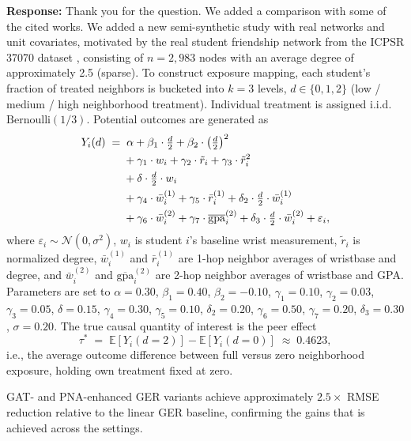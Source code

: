 \documentclass{article}
\theoremstyle{plain}
\theoremstyle{definition}
\theoremstyle{remark}
\begin{document}
\noindent\textbf{Response:}
Thank you for the question. We added a comparison with some of the cited works. We added a new semi-synthetic study with real networks and unit covariates, motivated by the real student friendship network from the ICPSR 37070 dataset
\citep{aronow2017estimating}, consisting of $n = 2{,}983$ nodes with an average
degree of approximately 2.5 (sparse). To construct exposure mapping, each student's fraction of treated neighbors is bucketed into $k = 3$ levels,
$d \in \{0, 1, 2\}$ (low / medium / high neighborhood treatment). Individual
treatment is assigned i.i.d.\ $\mathrm{Bernoulli}(1/3)$. 
Potential outcomes are generated as
\begin{align}
  Y_i(d) \;=\;
    &\;\alpha
     + \beta_1 \cdot \tfrac{d}{2}
     + \beta_2 \cdot \bigl(\tfrac{d}{2}\bigr)^2 \notag \\
    &+ \gamma_1 \cdot w_i
     + \gamma_2 \cdot \tilde{r}_i
     + \gamma_3 \cdot \tilde{r}_i^2 \notag \\
    &+ \delta \cdot \tfrac{d}{2} \cdot w_i \notag \\
    &+ \gamma_4 \cdot \bar{w}_i^{(1)}
     + \gamma_5 \cdot \bar{r}_i^{(1)}
     + \delta_2 \cdot \tfrac{d}{2} \cdot \bar{w}_i^{(1)} \notag \\
    &+ \gamma_6 \cdot \bar{w}_i^{(2)}
     + \gamma_7 \cdot \overline{\mathrm{gpa}}_i^{(2)}
     + \delta_3 \cdot \tfrac{d}{2} \cdot \bar{w}_i^{(2)}
     + \varepsilon_i, \label{eq:dgp}
\end{align}
where $\varepsilon_i \sim \mathcal{N}(0, \sigma^2)$,
$w_i$ is student $i$'s baseline wrist measurement,
$\tilde{r}_i$ is normalized degree,
$\bar{w}_i^{(1)}$ and $\bar{r}_i^{(1)}$ are 1-hop neighbor averages of
wristbase and degree, and $\bar{w}_i^{(2)}$ and
$\overline{\mathrm{gpa}}_i^{(2)}$ are 2-hop neighbor averages of wristbase and
GPA. Parameters are set to
$\alpha=0.30$, $\beta_1=0.40$, $\beta_2=-0.10$,
$\gamma_1=0.10$, $\gamma_2=0.03$, $\gamma_3=0.05$,
$\delta=0.15$, $\gamma_4=0.30$, $\gamma_5=0.10$, $\delta_2=0.20$,
$\gamma_6=0.50$, $\gamma_7=0.20$, $\delta_3=0.30$, $\sigma=0.20$. 
The true causal quantity of interest is the peer effect
\begin{equation}
  \tau^* \;=\; \mathbb{E}[Y_i(d{=}2)] - \mathbb{E}[Y_i(d{=}0)]
         \;\approx\; 0.4623,
\end{equation}
i.e., the average outcome difference between full versus zero neighborhood
exposure, holding own treatment fixed at zero.


GAT- and PNA-enhanced GER variants achieve approximately $2.5\times$ RMSE
reduction relative to the linear GER baseline, confirming the gains that is achieved across the settings. 
\end{document}

